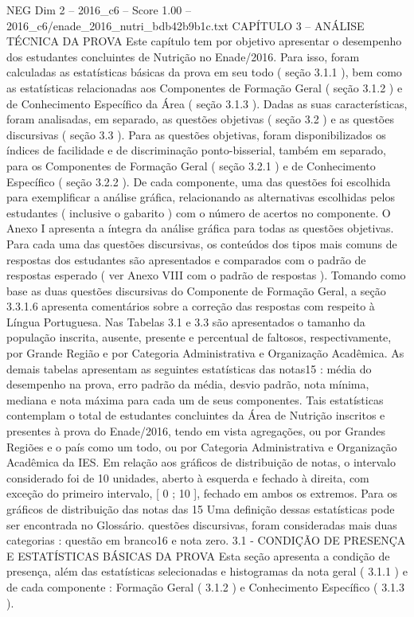 \begin{textsample}{NEG Dim 2 – 2016\_c6 – Score 1.00 – 2016\_c6/enade\_2016\_nutri\_bdb42b9b1c.txt}  \label{ex:f2_neg_228}
CAPÍTULO 3 – ANÁLISE TÉCNICA DA PROVA Este capítulo tem por objetivo apresentar o desempenho dos estudantes concluintes de Nutrição no Enade/2016.
Para isso, foram calculadas as estatísticas básicas da prova em seu todo ( seção 3.1.1 ), bem como as estatísticas relacionadas aos Componentes de Formação Geral ( seção 3.1.2 ) e de Conhecimento Específico da Área ( seção 3.1.3 ).
Dadas as suas características, foram analisadas, em separado, as questões objetivas ( seção 3.2 ) e as questões discursivas ( seção 3.3 ).
Para as questões objetivas, foram disponibilizados os índices de facilidade e de discriminação ponto-bisserial, também em separado, para os Componentes de Formação Geral ( seção 3.2.1 ) e de Conhecimento Específico ( seção 3.2.2 ).
De cada componente, uma das questões foi escolhida para exemplificar a análise gráfica, relacionando as alternativas escolhidas pelos estudantes ( inclusive o gabarito ) com o número de acertos no componente.
O Anexo I apresenta a íntegra da análise gráfica para todas as questões objetivas.
Para cada uma das questões discursivas, os conteúdos dos tipos mais comuns de respostas dos estudantes são apresentados e comparados com o padrão de respostas esperado ( ver Anexo VIII com o padrão de respostas ).
Tomando como base as duas questões discursivas do Componente de Formação Geral, a seção 3.3.1.6 apresenta comentários sobre a correção das respostas com respeito à Língua Portuguesa.
Nas Tabelas 3.1 e 3.3 são apresentados o tamanho da população inscrita, ausente, presente e percentual de faltosos, respectivamente, por Grande Região e por Categoria Administrativa e Organização Acadêmica.
As demais tabelas apresentam as seguintes estatísticas das notas15 : média do desempenho na prova, erro padrão da média, desvio padrão, nota mínima, mediana e nota máxima para cada um de seus componentes.
Tais estatísticas contemplam o total de estudantes concluintes da Área de Nutrição inscritos e presentes à prova do Enade/2016, tendo em vista agregações, ou por Grandes Regiões e o país como um todo, ou por Categoria Administrativa e Organização Acadêmica da IES.
Em relação aos gráficos de distribuição de notas, o intervalo considerado foi de 10 unidades, aberto à esquerda e fechado à direita, com exceção do primeiro intervalo, [ 0 ; 10 ], fechado em ambos os extremos.
Para os gráficos de distribuição das notas das 15 Uma definição dessas estatísticas pode ser encontrada no Glossário. questões discursivas, foram consideradas mais duas categorias : questão em branco16 e nota zero. 3.1 - CONDIÇÃO DE PRESENÇA E ESTATÍSTICAS BÁSICAS DA PROVA Esta seção apresenta a condição de presença, além das estatísticas selecionadas e histogramas da nota geral ( 3.1.1 ) e de cada componente : Formação Geral ( 3.1.2 ) e Conhecimento Específico ( 3.1.3 ).

\end{textsample}
